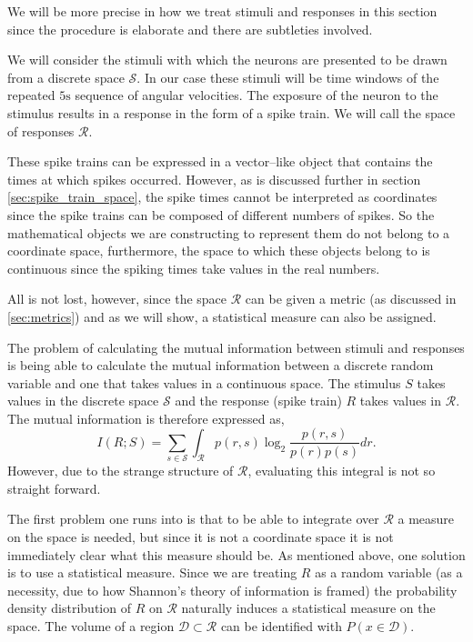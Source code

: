 \documentclass[10pt,a4paper]{book}
\begin{document}
We will be more precise in how we treat stimuli and responses in this section since the procedure is elaborate and there are subtleties involved.

We will consider the stimuli with which the neurons are presented to be drawn from a discrete space $\mathcal{S}$. In our case these stimuli will be time windows of the repeated $5\text{s}$ sequence of angular velocities. The exposure of the neuron to the stimulus results in a response in the form of a spike train. We will call the space of responses $\mathcal{R}$. 

These spike trains can be expressed in a vector--like object that contains the times at which spikes occurred. However, as is discussed further in section \ref{sec:spike_train_space}, the spike times cannot be interpreted as coordinates since the spike trains can be composed of different numbers of spikes. So the mathematical objects we are constructing to represent them do not belong to a coordinate space, furthermore, the space to which these objects belong to is continuous since the spiking times take values in the real numbers.

All is not lost, however, since the space $\mathcal{R}$ can be given a metric (as discussed in \ref{sec:metrics}) and as we will show, a statistical measure can also be assigned.

The problem of calculating the mutual information between stimuli and responses is being able to calculate the mutual information between a discrete random variable and one that takes values in a continuous space. The stimulus $S$ takes values in the discrete space $\mathcal{S}$ and the response (spike train) $R$ takes values in $\mathcal{R}$. The mutual information is therefore expressed as,
\begin{equation}
I(R;S) = \sum_{s \in \mathcal{S}} \int_{\mathcal{R}} p(r,s)\log_2\dfrac{p(r,s)}{p(r)p(s)} dr.
\end{equation}
However, due to the strange structure of $\mathcal{R}$, evaluating this integral is not so straight forward.

The first problem one runs into is that to be able to integrate over $\mathcal{R}$ a measure on the space is needed, but since it is not a coordinate space it is not immediately clear what this measure should be. As mentioned above, one solution is to use a statistical measure. Since we are treating $R$ as a random variable (as a necessity, due to how Shannon's theory of information is framed) the probability density distribution of $R$ on $\mathcal{R}$ naturally induces a statistical measure on the space. The volume of a region $\mathcal{D} \subset \mathcal{R}$ can be identified with $P(x\in \mathcal{D})$.
\end{document}
